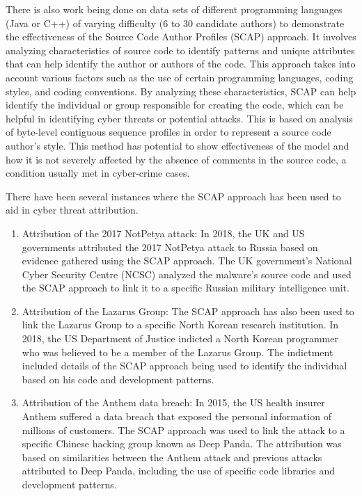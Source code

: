 \documentclass[12pt]{report}
\begin{document}
There is also work being done on data sets of different programming languages (Java or C++) of varying difficulty (6 to 30 candidate authors) to demonstrate the effectiveness of the Source Code Author Profiles (SCAP) approach.  It involves analyzing characteristics of source code to identify patterns and unique attributes that can help identify the author or authors of the code. This approach takes into account various factors such as the use of certain programming languages, coding styles, and coding conventions. By analyzing these characteristics, SCAP can help identify the individual or group responsible for creating the code, which can be helpful in identifying cyber threats or potential attacks.  This is based on analysis of byte-level contiguous sequence profiles in order to represent a source code author’s style.  \cite{IFIP:2006} This method has potential to show effectiveness of the model and how it is not severely affected by the absence of comments in the source code, a condition usually met in cyber-crime cases.  

There have been several instances where the SCAP approach has been used to aid in cyber threat attribution.

\begin{enumerate}
  \item Attribution of the 2017 NotPetya attack: In 2018, the UK and US governments attributed the 2017 NotPetya attack to Russia based on evidence gathered using the SCAP approach. The UK government's National Cyber Security Centre (NCSC) analyzed the malware's source code and used the SCAP approach to link it to a specific Russian military intelligence unit.
  \item Attribution of the Lazarus Group: The SCAP approach has also been used to link the Lazarus Group to a specific North Korean research institution. In 2018, the US Department of Justice indicted a North Korean programmer who was believed to be a member of the Lazarus Group. The indictment included details of the SCAP approach being used to identify the individual based on his code and development patterns.
  \item Attribution of the Anthem data breach: In 2015, the US health insurer Anthem suffered a data breach that exposed the personal information of millions of customers. The SCAP approach was used to link the attack to a specific Chinese hacking group known as Deep Panda. The attribution was based on similarities between the Anthem attack and previous attacks attributed to Deep Panda, including the use of specific code libraries and development patterns.
\end{enumerate}
\end{document}
